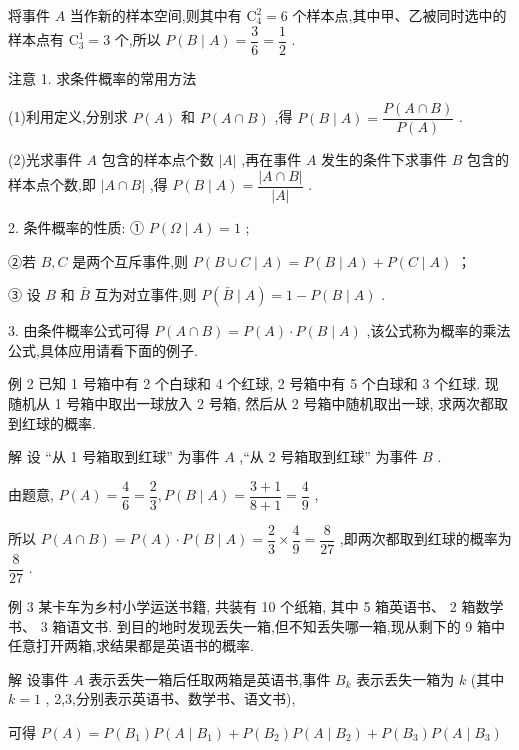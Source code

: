 将事件 $A$ 当作新的样本空间,则其中有 ${\mathrm{C}}_{4}^{2} = 6$ 个样本点,其中甲、乙被同时选中的样本点有 ${\mathrm{C}}_{3}^{1} = 3$ 个,所以 $P\left( {B \mid  A}\right)  = \dfrac{3}{6} = \dfrac{1}{2}$ .

注意 1. 求条件概率的常用方法

(1)利用定义,分别求 $P\left( A\right)$ 和 $P\left( {A \cap  B}\right)$ ,得 $P\left( {B \mid  A}\right)  = \dfrac{P\left( {A \cap  B}\right) }{P\left( A\right) }$ .

(2)光求事件 $A$ 包含的样本点个数 $\left| A\right|$ ,再在事件 $A$ 发生的条件下求事件 $B$ 包含的样本点个数,即 $\left| {A \cap  B}\right|$ ,得 $P\left( {B \mid  A}\right)  = \dfrac{\left| A \cap  B\right| }{\left| A\right| }$ .

2. 条件概率的性质: ① $P\left( {\Omega  \mid  A}\right)  = 1$ ;

②若 $B,C$ 是两个互斥事件,则 $P\left( {B \cup  C \mid  A}\right)  = P\left( {B \mid  A}\right)  + P\left( {C \mid  A}\right)$ ；

③ 设 $B$ 和 $\bar{B}$ 互为对立事件,则 $P\left( {\bar{B} \mid  A}\right)  = 1 - P\left( {B \mid  A}\right)$ .

3. 由条件概率公式可得 $P\left( {A \cap  B}\right)  = P\left( A\right)  \cdot  P\left( {B \mid  A}\right)$ ,该公式称为概率的乘法公式,具体应用请看下面的例子.

例 2 已知 1 号箱中有 2 个白球和 4 个红球, 2 号箱中有 5 个白球和 3 个红球. 现随机从 1 号箱中取出一球放入 2 号箱, 然后从 2 号箱中随机取出一球, 求两次都取到红球的概率.

解 设 “从 1 号箱取到红球” 为事件 $A$ ,“从 2 号箱取到红球” 为事件 $B$ .

由题意, $P\left( A\right)  = \dfrac{4}{6} = \dfrac{2}{3},P\left( {B \mid  A}\right)  = \dfrac{3 + 1}{8 + 1} = \dfrac{4}{9}$ ,

所以 $P\left( {A \cap  B}\right)  = P\left( A\right)  \cdot  P\left( {B \mid  A}\right)  = \dfrac{2}{3} \times  \dfrac{4}{9} = \dfrac{8}{27}$ ,即两次都取到红球的概率为 $\dfrac{8}{27}$ .

例 3 某卡车为乡村小学运送书籍, 共装有 10 个纸箱, 其中 5 箱英语书、 2 箱数学书、 3 箱语文书. 到目的地时发现丢失一箱,但不知丢失哪一箱,现从剩下的 9 箱中任意打开两箱,求结果都是英语书的概率.

解 设事件 $A$ 表示丢失一箱后任取两箱是英语书,事件 ${B}_{k}$ 表示丢失一箱为 $k$ (其中 $k = 1$ , 2,3,分别表示英语书、数学书、语文书),

可得 $P\left( A\right)  = P\left( {B}_{1}\right) P\left( {A \mid  {B}_{1}}\right)  + P\left( {B}_{2}\right) P\left( {A \mid  {B}_{2}}\right)  + P\left( {B}_{3}\right) P\left( {A \mid  {B}_{3}}\right)$

